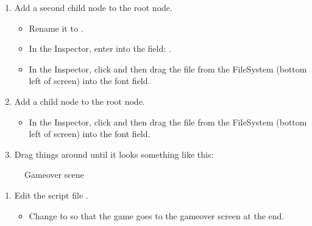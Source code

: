 \documentclass[letterpaper,10pt,english]{sphinxmanual}
\begin{document}
\begin{sphinxVerbatim}[commandchars=\\\{\}]

  
\end{sphinxVerbatim}
\begin{enumerate}
%
\setcounter{enumi}{5}
\item {} 
\sphinxAtStartPar
Add a second  child node to the root node.
\begin{itemize}
\item {} 
\sphinxAtStartPar
Rename it to .

\item {} 
\sphinxAtStartPar
In the Inspector, enter into the  field: .

\item {} 
\sphinxAtStartPar
In the Inspector, click  and then drag the
 file from the FileSystem (bottom left of screen)
into the \sphinxstylestrong{{[}empty{]}} font field.

\end{itemize}

\item {} 
\sphinxAtStartPar
Add a  child node to the root node.
\begin{itemize}
\item {} 
\sphinxAtStartPar
In the Inspector, click  and then drag the
 file from the FileSystem (bottom left of screen)
into the \sphinxstylestrong{{[}empty{]}} font field.

\end{itemize}

\item {} 
\sphinxAtStartPar
Drag things around until it looks something like this:

\end{enumerate}

\begin{figure}[htbp]
\centering
\capstart

\noindent{}
\caption{Gameover scene}\label{\detokenize{tutorial:id4}}\end{figure}
\begin{enumerate}
%
\setcounter{enumi}{8}
\item {} 
\sphinxAtStartPar
Edit the script file .
\begin{itemize}
\item {} 
\sphinxAtStartPar
Change  to 
so that the game goes to the gameover screen at the end.

\end{itemize}

\end{enumerate}
\end{document}

